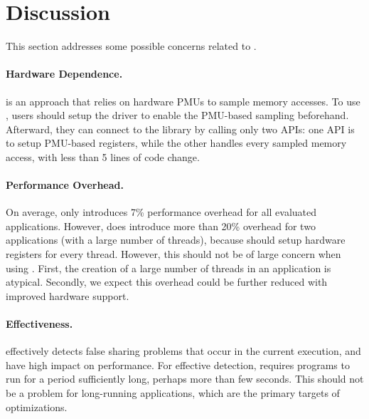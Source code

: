 \section{Discussion}

\label{sec:discuss}

This section addresses some possible concerns related to \Cheetah{}. 

\paragraph{Hardware Dependence.} \cheetah{} is an approach that relies on hardware PMUs to sample memory accesses. To use \cheetah{}, users should setup the driver to enable the PMU-based sampling beforehand. Afterward, they can connect to the \cheetah{} library by calling only two APIs: one API is to setup PMU-based registers, while the other handles every sampled memory access, with less than 5 lines of code change. 

\paragraph{Performance Overhead.} On average, \Cheetah{} only introduces 7\% performance overhead for all evaluated applications. However, \cheetah{} does introduce more than 20\% overhead for two applications (with a large number of threads), because \cheetah{} should setup hardware registers for every thread. However, this should not be of large concern when using \cheetah{}. First, the creation of a large number of threads in an application is atypical. Secondly, we expect this overhead could be further reduced with improved hardware support. 

\paragraph{Effectiveness.} \Cheetah{} effectively detects false sharing problems that occur in the current execution, and have high impact on performance. For effective detection, \Cheetah{} requires programs to run for a period sufficiently long, perhaps more than few seconds. This should not be a problem for long-running applications, which are the primary targets of optimizations. 
